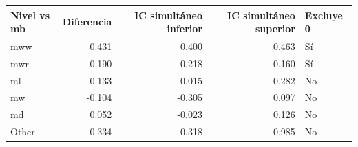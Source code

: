 \begin{tabular}{lrrrl}
\toprule
Nivel vs mb & Diferencia & IC simultáneo inferior & IC simultáneo superior & Excluye 0 \\
\midrule
mww & 0.431 & 0.400 & 0.463 & Sí \\
mwr & -0.190 & -0.218 & -0.160 & Sí \\
ml & 0.133 & -0.015 & 0.282 & No \\
mw & -0.104 & -0.305 & 0.097 & No \\
md & 0.052 & -0.023 & 0.126 & No \\
Other & 0.334 & -0.318 & 0.985 & No \\
\bottomrule
\end{tabular}
